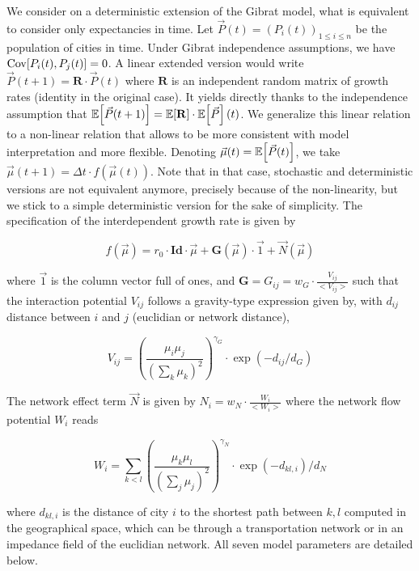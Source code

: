 We  consider on a deterministic extension of the Gibrat model, what is equivalent to consider only expectancies in time. Let $\vec{P}(t)=(P_i(t))_{1\leq i\leq n}$ be the population of cities in time. Under Gibrat independence assumptions, we have $\operatorname{Cov}\!\left[P_i(t),P_j(t)\right]=0$. A linear extended version would write $\vec{P}(t+1)=\mathbf{R}\cdot \vec{P}(t)$ where $\mathbf{R}$ is an independent random matrix of growth rates (identity in the original case). It yields directly thanks to the independence assumption that $\operatorname{\mathbb{E}}\!\left[\vec{P}(t+1)\right]=\operatorname{\mathbb{E}}\!\left[\mathbf{R}\right]\cdot\operatorname{\mathbb{E}}\!\left[\vec{P}\right](t)$. We generalize this linear relation to a non-linear relation that allows to be more consistent with model interpretation and more flexible. Denoting $\vec{\mu}(t)=\operatorname{\mathbb{E}}\!\left[\vec{P}(t)\right]$, we take $\vec{\mu}(t+1)=\Delta t\cdot f(\vec{\mu}(t))$. Note that in that case, stochastic and deterministic versions are not equivalent anymore, precisely because of the non-linearity, but we stick to a simple deterministic version for the sake of simplicity. The specification of the interdependent growth rate is given by

\begin{equation}
f(\vec{\mu}) = r_0\cdot \mathbf{Id}\cdot \vec{\mu} + \mathbf{G}\left(\vec{\mu}\right)\cdot \vec{1} + \vec{N}\left(\vec{\mu}\right)
\end{equation}


where $\vec{1}$ is the column vector full of ones, and $\mathbf{G} = G_{ij} = w_G\cdot \frac{V_{ij}}{<V_{ij}>}$ such that the interaction potential $V_{ij}$ follows a gravity-type expression given by, with $d_{ij}$ distance between $i$ and $j$ (euclidian or network distance),

\begin{equation}
V_{ij} = \left(\frac{\mu_i\mu_j}{\left(\sum_k{\mu_k}\right)^2}\right)^{\gamma_G}\cdot \exp{\left(-d_{ij}/d_G\right)}
\end{equation}

The network effect term $\vec{N}$ is given by $N_{i} = w_N \cdot \frac{W_i}{<W_i>}$ where the network flow potential $W_i$ reads

\begin{equation}
W_{i} = \sum_{k < l} \left(\frac{\mu_k\mu_l}{\left(\sum_j\mu_j\right)^2}\right)^{\gamma_N} \cdot \exp{\left(-d_{kl,i}\right)/d_N}
\end{equation}

where $d_{kl,i}$ is the distance of city $i$ to the shortest path between $k,l$ computed in the geographical space, which can be through a transportation network or in an impedance field of the euclidian network. All seven model parameters are detailed below.


